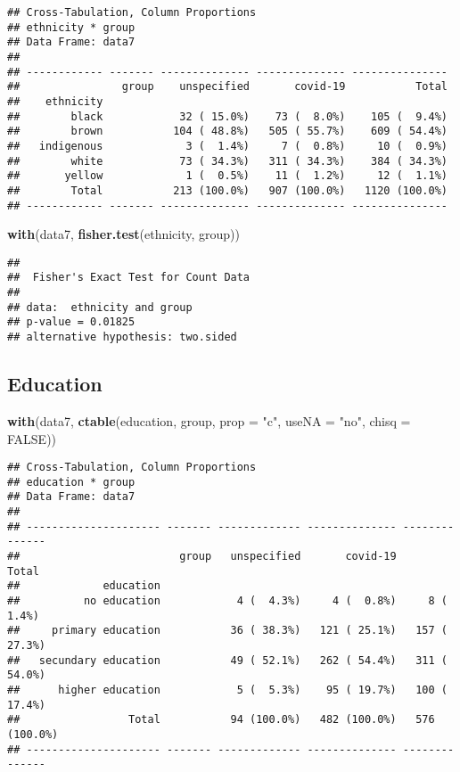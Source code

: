 \documentclass[
]{article}
\newenvironment{Shaded}{\begin{snugshade}}{\end{snugshade}}
\newcommand{\DataTypeTok}[1]{\textcolor[rgb]{0.13,0.29,0.53}{#1}}
\newcommand{\KeywordTok}[1]{\textcolor[rgb]{0.13,0.29,0.53}{\textbf{#1}}}
\newcommand{\NormalTok}[1]{#1}
\newcommand{\OtherTok}[1]{\textcolor[rgb]{0.56,0.35,0.01}{#1}}
\newcommand{\StringTok}[1]{\textcolor[rgb]{0.31,0.60,0.02}{#1}}
\begin{document}
\begin{verbatim}
## Cross-Tabulation, Column Proportions  
## ethnicity * group  
## Data Frame: data7  
## 
## ------------ ------- -------------- -------------- ---------------
##                group    unspecified       covid-19           Total
##    ethnicity                                                      
##        black            32 ( 15.0%)    73 (  8.0%)    105 (  9.4%)
##        brown           104 ( 48.8%)   505 ( 55.7%)    609 ( 54.4%)
##   indigenous             3 (  1.4%)     7 (  0.8%)     10 (  0.9%)
##        white            73 ( 34.3%)   311 ( 34.3%)    384 ( 34.3%)
##       yellow             1 (  0.5%)    11 (  1.2%)     12 (  1.1%)
##        Total           213 (100.0%)   907 (100.0%)   1120 (100.0%)
## ------------ ------- -------------- -------------- ---------------
\end{verbatim}

\begin{Shaded}
\begin{Highlighting}[]
\KeywordTok{with}\NormalTok{(data7, }\KeywordTok{fisher.test}\NormalTok{(ethnicity, group))}
\end{Highlighting}
\end{Shaded}

\begin{verbatim}
## 
##  Fisher's Exact Test for Count Data
## 
## data:  ethnicity and group
## p-value = 0.01825
## alternative hypothesis: two.sided
\end{verbatim}

\hypertarget{education}{%
\subsection{Education}\label{education}}

\begin{Shaded}
\begin{Highlighting}[]
\KeywordTok{with}\NormalTok{(data7, }\KeywordTok{ctable}\NormalTok{(education, group, }\DataTypeTok{prop =} \StringTok{"c"}\NormalTok{, }\DataTypeTok{useNA =} \StringTok{"no"}\NormalTok{, }\DataTypeTok{chisq =} \OtherTok{FALSE}\NormalTok{))}
\end{Highlighting}
\end{Shaded}

\begin{verbatim}
## Cross-Tabulation, Column Proportions  
## education * group  
## Data Frame: data7  
## 
## --------------------- ------- ------------- -------------- --------------
##                         group   unspecified       covid-19          Total
##             education                                                    
##          no education            4 (  4.3%)     4 (  0.8%)     8 (  1.4%)
##     primary education           36 ( 38.3%)   121 ( 25.1%)   157 ( 27.3%)
##   secundary education           49 ( 52.1%)   262 ( 54.4%)   311 ( 54.0%)
##      higher education            5 (  5.3%)    95 ( 19.7%)   100 ( 17.4%)
##                 Total           94 (100.0%)   482 (100.0%)   576 (100.0%)
## --------------------- ------- ------------- -------------- --------------
\end{verbatim}
\end{document}

